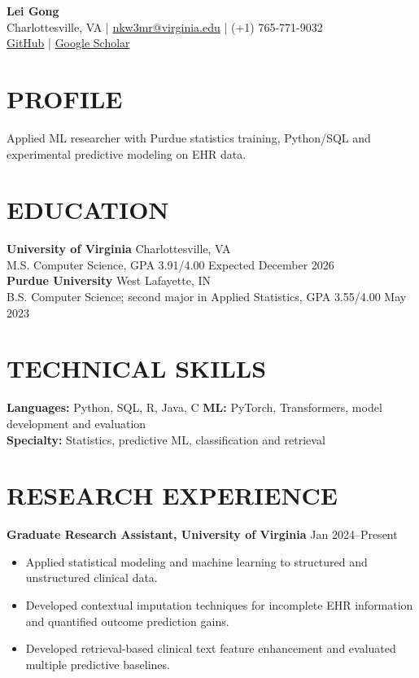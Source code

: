 \documentclass[10pt, letterpaper]{article}
\begin{document}
\setlength{\parindent}{0pt}
\begin{center}
{\fontsize{23}{25}\selectfont\textbf{Lei Gong}}\\[3pt]
Charlottesville, VA \quad | \quad \href{mailto:nkw3mr@virginia.edu}{nkw3mr@virginia.edu} \quad | \quad (+1) 765-771-9032\\[2pt]
\href{https://github.com/LeiGong0125Carrot}{GitHub} \quad | \quad \href{https://scholar.google.com/citations?user=8QLAkKMAAAAJ}{Google Scholar}
\end{center}
\vspace{-3mm}
\section{PROFILE}
Applied ML researcher with Purdue statistics training, Python/SQL and experimental predictive modeling on EHR data.
\section{EDUCATION}
\textbf{University of Virginia} \hfill Charlottesville, VA \\
M.S. Computer Science, GPA 3.91/4.00 \hfill Expected December 2026\\[1pt]
\textbf{Purdue University} \hfill West Lafayette, IN \\
B.S. Computer Science; second major in Applied Statistics, GPA 3.55/4.00 \hfill May 2023
\section{TECHNICAL SKILLS}
\textbf{Languages:} Python, SQL, R, Java, C \quad \textbf{ML:} PyTorch, Transformers, model development and evaluation\\
\textbf{Specialty:} Statistics, predictive ML, classification and retrieval
\section{RESEARCH EXPERIENCE}
\textbf{Graduate Research Assistant, University of Virginia} \hfill Jan 2024--Present
\begin{itemize}
\item Applied statistical modeling and machine learning to structured and unstructured clinical data.
\item Developed contextual imputation techniques for incomplete EHR information and quantified outcome prediction gains.
\item Developed retrieval-based clinical text feature enhancement and evaluated multiple predictive baselines.
\end{itemize}
\end{document}
